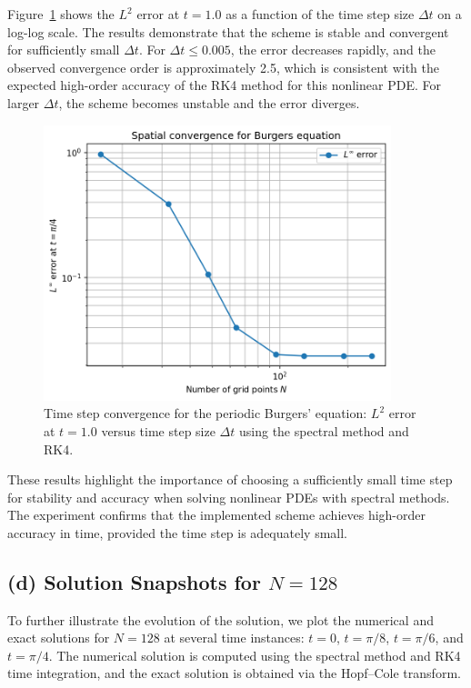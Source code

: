 \documentclass{article}
\begin{document}
Figure~\ref{fig:burgers_dt_convergence} shows the $L^2$ error at $t=1.0$ as a function of the time step size $\Delta t$ on a log-log scale. The results demonstrate that the scheme is stable and convergent for sufficiently small $\Delta t$. For $\Delta t \leq 0.005$, the error decreases rapidly, and the observed convergence order is approximately 2.5, which is consistent with the expected high-order accuracy of the RK4 method for this nonlinear PDE. For larger $\Delta t$, the scheme becomes unstable and the error diverges.

\begin{figure}[htbp]
    \centering
    \includegraphics[width=0.9\textwidth]{figure/burgers_N_convergence.png}
    \caption{Time step convergence for the periodic Burgers' equation: $L^2$ error at $t=1.0$ versus time step size $\Delta t$ using the spectral method and RK4.}
    \label{fig:burgers_dt_convergence}
\end{figure}

These results highlight the importance of choosing a sufficiently small time step for stability and accuracy when solving nonlinear PDEs with spectral methods. The experiment confirms that the implemented scheme achieves high-order accuracy in time, provided the time step is adequately small.

\subsection*{(d) Solution Snapshots for $N=128$}
To further illustrate the evolution of the solution, we plot the numerical and exact solutions for $N=128$ at several time instances: $t=0$, $t=\pi/8$, $t=\pi/6$, and $t=\pi/4$. The numerical solution is computed using the spectral method and RK4 time integration, and the exact solution is obtained via the Hopf--Cole transform.
\end{document}
